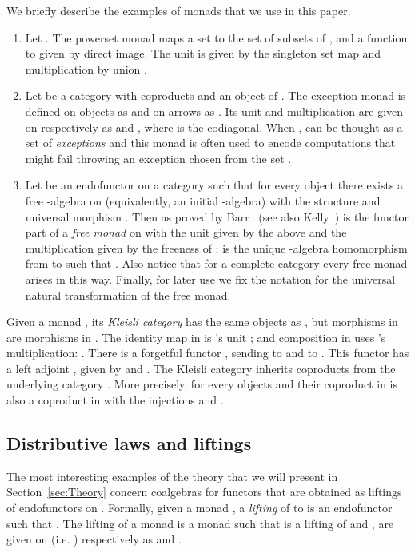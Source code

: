 \documentclass[oribibl,envcountsame,envcountsect,runningheads]{llncs}
\renewcommand{\>}{\rangle}
\begin{document}
\begin{example}\label{ex:mnds}
We briefly describe the examples of monads that
we use in this paper.
\begin{enumerate}\item \label{pt:powersetmonad} Let . The powerset monad  maps a set  to the set  of
  subsets of , and a function  to  given by direct image. The unit is given by the
  singleton set map  and multiplication by union
  .

\item \label{pt:exceptionmonad}  Let  be a category with coproducts and  an object of . The exception monad  is defined on objects as 
and on arrows  as . Its unit and multiplication are given on  respectively as  and , where  is the codiagonal. When ,  can be thought as a set of {\em exceptions} and this monad is often used to encode computations that might fail throwing an exception chosen from the set .

\item \label{pt:freemonad} Let  be an endofunctor on a category  such that for every
  object  there exists a free -algebra  on 
  (equivalently, an initial
  -algebra) with the structure  and
  universal morphism . Then as proved by Barr~\cite{barr:70} (see also
  Kelly~\cite{kelly:80})  is the functor part of a \emph{free
  monad} on  with the unit given by the above  and the
  multiplication given by the freeness of :  is the
  unique -algebra homomorphism from  to
   such that .
  Also notice that for a complete category every free monad
  arises in this way. Finally, for later use we fix the notation  for the universal natural transformation of the free monad.
\end{enumerate}
\end{example}
Given a monad , its \emph{Kleisli category}  has the same objects as , but morphisms  in  are morphisms  in . The identity map  in  is 's unit ; and composition  in  uses 's multiplication: . There is a forgetful functor , sending  to  and  to . This functor has a left adjoint , given by  and . The Kleisli category  inherits coproducts from the underlying category . More precisely, for every objects  and  their coproduct  in  is also a coproduct in  with the injections  and .
\subsection{Distributive laws and liftings}\label{SSec:Distributive}
The most interesting examples of the theory that we will present in Section~\ref{sec:Theory} concern coalgebras
for functors  that are obtained as liftings of endofunctors  on .
Formally, given a monad , a \emph{lifting} of  to  is an endofunctor
  such that . The lifting of a monad  is a monad  such that
 is a lifting of  and ,  are given on  (i.e. ) respectively as  and .
\end{document}
